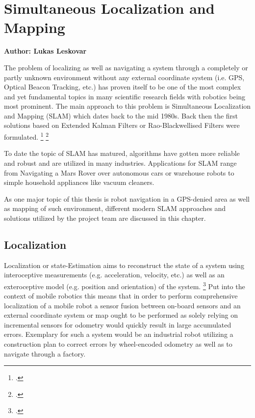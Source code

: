 \chapter{Simultaneous Localization and Mapping}
\label{chapter:slam}

\textbf{Author: Lukas Leskovar} 

The problem of localizing as well as navigating a system through a completely or partly unknown environment without any external coordinate system (i.e. GPS, Optical Beacon Tracking, etc.) has proven itself to be one of the most complex and yet fundamental topics in many scientific research fields with robotics being most prominent. The main approach to this problem is Simultaneous Localization and Mapping (SLAM) which dates back to the mid 1980s. Back then the first solutions based on Extended Kalman Filters or Rao-Blackwellised Filters were formulated. \footcite{durrantSlam2006}  \footcite{cadenaSlamFuture2016}

To date the topic of SLAM has matured, algorithms have gotten more reliable and robust and are utilized in many industries. Applications for SLAM range from Navigating a Mars Rover over autonomous cars or warehouse robots to simple household appliances like vacuum cleaners. 

As one major topic of this thesis is robot navigation in a GPS-denied area as well as mapping of such environment, different modern SLAM approaches and solutions utilized by the project team are discussed in this chapter.

\section{Localization}
Localization or state-Estimation aims to reconstruct the state of a system using interoceptive measurements (e.g. acceleration, velocity, etc.) as well as an exteroceptive model (e.g. position and orientation) of the system. \footcite{barfootStateEstimation2017}
Put into the context of mobile robotics this means that in order to perform comprehensive localization of a mobile robot a sensor fusion between on-board sensors and an external coordinate system or map ought to be performed as solely relying on incremental sensors for odometry would quickly result in large accumulated errors.
Exemplary for such a system would be an industrial robot utilizing a construction plan to correct errors by wheel-encoded odometry as well as to navigate through a factory. 

